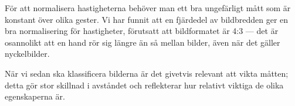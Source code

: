 \documentclass[../rapport_MVEX01-11-05]{subfiles}
\begin{document}
För att normalisera hastigheterna behöver man ett bra ungefärligt mått
som är konstant över olika gester. Vi har funnit att en fjärdedel av
bildbredden ger en bra normalisering för hastigheter, förutsatt att
bildformatet är 4:3 --- det är osannolikt att en hand rör sig längre
än så mellan bilder, även när det gäller nyckelbilder.

När vi sedan ska klassificera bilderna är det givetvis relevant att
vikta måtten; detta gör stor skillnad i avståndet och reflekterar
hur relativt viktiga de olika egenskaperna är.

\end{document}
